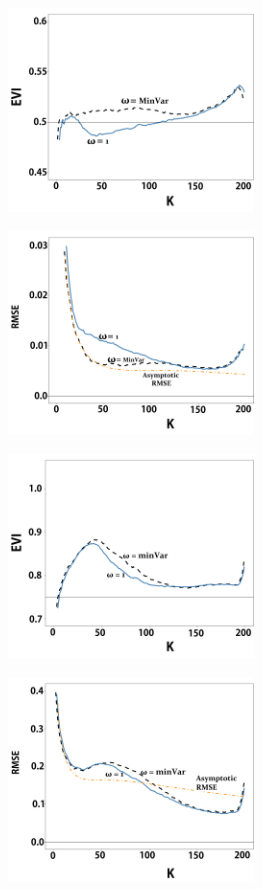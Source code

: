 	\begin{figure}[h]
		\centering
		\begin{subfigure}[h]{0.40\linewidth}
			\includegraphics[width=65mm]{./plots/paper1/eviFrechetKappa.png}
		\end{subfigure}
		\hspace{\fill}
		\begin{subfigure}[h]{0.40\linewidth}
			\includegraphics[width=65mm]{./plots/paper1/mseFrechetKappa.png}
		\end{subfigure}
		\bigskip
		\begin{subfigure}[h]{0.40\linewidth}
			\includegraphics[width=65mm]{./plots/paper1/eviBurrKappa.png}
		\end{subfigure}
		\hspace{\fill}
		\begin{subfigure}[h]{0.40\linewidth}
			\includegraphics[width=65mm]{./plots/paper1/mseBurrKappa.png}

\end{subfigure}
\end{figure}

